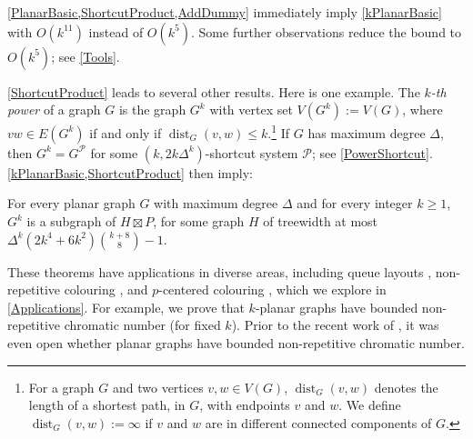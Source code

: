 \documentclass{patmorin}
\DeclareMathOperator{\dist}{dist}
\newcommand{\PP}{\mathcal{P}}
\renewcommand{\geq}{\geqslant}
\renewcommand{\leq}{\leqslant}
\begin{document}
\cref{PlanarBasic,ShortcutProduct,AddDummy} immediately imply \cref{kPlanarBasic} with $O(k^{11})$ instead of $O(k^5)$. Some further observations reduce the bound to $O(k^5)$; see \cref{Tools}. 

\cref{ShortcutProduct} leads to several other results. Here is one example. The \emph{$k$-th power} of a graph $G$ is the graph $G^k$ with vertex set $V(G^k):=V(G)$, where $vw\in E(G^k)$ if and only if $\dist_G(v,w)\leq k$.\footnote{For a graph $G$ and two vertices $v,w\in V(G)$, $\dist_G(v,w)$  denotes the length of a shortest path, in $G$, with endpoints $v$ and $w$.  We define $\dist_G(v,w):=\infty$ if $v$ and $w$ are in different connected components of $G$.} If $G$ has maximum degree $\Delta$, then $G^k = G^\PP$ for some $(k,2k\Delta^{k})$-shortcut system $\PP$; see \cref{PowerShortcut}. \cref{kPlanarBasic,ShortcutProduct} then imply:

\begin{thm}
\label{kPowerBasic}
For every planar graph $G$ with maximum degree $\Delta$ and for every integer $k\geq 1$, $G^k$ is a subgraph of $H\boxtimes P$, for some graph $H$ of treewidth at most 
$\Delta^{k} (2k^4+6k^2)\binom{k+8}{8}-1$. 
\end{thm}



These theorems have applications in diverse areas, including queue layouts  \citep{dujmovic.joret.ea:planar}, non-repetitive colouring  \citep{dujmovic.esperet.ea:planar}, and $p$-centered colouring  \citep{micek:personal}, 
which we explore in \cref{Applications}. For example, we prove that $k$-planar graphs have bounded non-repetitive chromatic number (for fixed $k$). Prior to the recent work of \citet{dujmovic.esperet.ea:planar}, it was even open whether planar graphs have bounded non-repetitive chromatic number.
\end{document}
